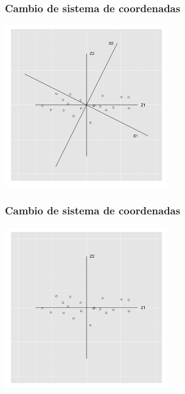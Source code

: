 \documentclass{beamer}
\begin{document}
\begin{frame}\frametitle{Cambio de sistema de coordenadas}

   \begin{overlayarea}{\textwidth}{8cm} 
 \begin{center}
   \includegraphics[height=7cm]{x1x2z1z2rotated10.png}
 \end{center}
   \end{overlayarea}
 \end{frame}
\begin{frame}\frametitle{Cambio de sistema de coordenadas}

   \begin{overlayarea}{\textwidth}{8cm} 
 \begin{center}
   \includegraphics[height=7cm]{x1x2z1z2rotated11.png}
 \end{center}
   \end{overlayarea}
 \end{frame}
\end{document}
